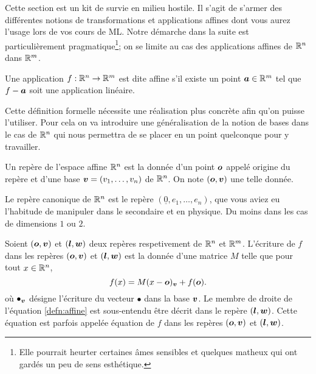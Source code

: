 \documentclass[11pt, a4paper]{article}
\begin{document}
Cette section est un kit de survie en milieu hostile. Il s'agit de
s'armer des différentes notions de transformations et applications
affines dont vous aurez l'usage lors de vos cours de ML. Notre
démarche dans la suite est particulièrement pragmatique\footnote{Elle
  pourrait heurter certaines âmes sensibles et quelques matheux qui ont
  gardés un peu de sens esthétique.}; on se limite au cas des
applications affines de $\mathbb{R}^n$ dans $\mathbb{R}^m$.
\begin{defn}
  Une application $f : \mathbb{R}^n \to \mathbb{R}^m$ est dite affine s'il existe un
  point $\boldsymbol{a} \in \mathbb{R}^m$ tel que $f - \boldsymbol{a}$ soit une application
  linéaire.
\end{defn}
\noindent Cette définition formelle nécessite une réalisation plus concrète afin
qu'on puisse l'utiliser. Pour cela on va introduire une généralisation
de la notion de bases dans le cas de $\mathbb{R}^n$ qui nous permettra de se
placer en un point quelconque pour y travailler.
\begin{defn}
  Un repère de l'espace affine $\mathbb{R}^n$ est la donnée d'un point
  $\boldsymbol{o}$ appelé origine du repère et d'une base
  $\boldsymbol{v} = (v_1, \ldots, v_n)$ de $\mathbb{R}^n$. On note
  $(\boldsymbol{o}, \boldsymbol{v})$ une telle donnée.
\end{defn}
\noindent Le repère canonique de $\mathbb{R}^n$ est le repère
$(\underline{0}, e_1, \ldots, e_n)$, que vous aviez eu l'habitude de
manipuler dans le secondaire et en physique. Du moins dans les cas de
dimensions $1$ ou $2$.
\begin{defn}
  Soient $(\boldsymbol{o}, \boldsymbol{v})$ et $(\boldsymbol{l}, \boldsymbol{w})$ deux repères
  respetivement de $\mathbb{R}^n$ et $\mathbb{R}^m$. L'écriture de $f$ dans les
  repères $(\boldsymbol{o}, \boldsymbol{v})$ et $(\boldsymbol{l}, \boldsymbol{w})$ est la donnée d'une
  matrice $M$ telle que pour tout $x \in \mathbb{R}^n$,
  \begin{equation}
    \label{defn:affine}
    f(x) = M(x - \boldsymbol{o})_{\boldsymbol{v}} + f(\boldsymbol{o}).
  \end{equation}
  où $\bullet_{\boldsymbol{v}}$ désigne l'écriture du vecteur $\bullet$ dans
  la base $\boldsymbol{v}$. Le membre de droite de l'équation
  \ref{defn:affine} est sous-entendu être décrit dans le repère
  $(\boldsymbol{l}, \boldsymbol{w})$. Cette équation est parfois appelée équation de
  $f$ dans les repères $(\boldsymbol{o}, \boldsymbol{v})$ et $(\boldsymbol{l}, \boldsymbol{w})$.
\end{defn}
\end{document}
